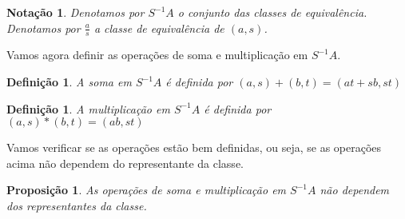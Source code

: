\documentclass[10pt,a4paper]{article}
\newtheorem{proposition}[theorem]{Proposição}
\newtheorem{notation}[theorem]{Notação}
\newtheorem{definition}[theorem]{Definição}
\begin{document}
\begin{notation}
	Denotamos por $S^{-1}A$ o conjunto das classes de equivalência. Denotamos por $\frac{a}{s}$ a classe de equivalência de $(a,s)$.
\end{notation}

Vamos agora definir as operações de soma e multiplicação em $S^{-1}A$.

\begin{definition}
	A soma em $S^{-1}A$ é definida por $(a,s)+(b,t)=(at+sb,st)$
\end{definition}

\begin{definition}
	A multiplicação em $S^{-1}A$ é definida por $(a,s)*(b,t)=(ab,st)$
\end{definition}

Vamos verificar se as operações estão bem definidas, ou seja, se as operações acima não dependem do representante da classe.

\begin{proposition}
	As operações de soma e multiplicação em $S^{-1}A$ não dependem dos representantes da classe.
\end{proposition}
\end{document}
